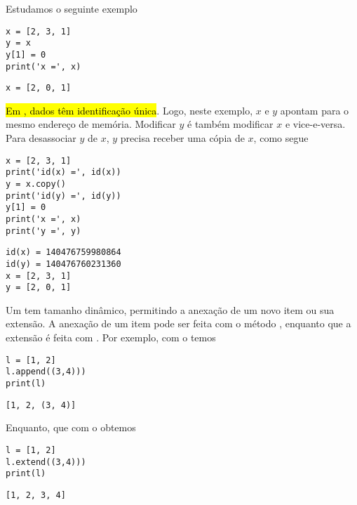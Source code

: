 \begin{obs}
  Estudamos o seguinte exemplo

\begin{lstlisting}
x = [2, 3, 1]
y = x
y[1] = 0
print('x =', x)
\end{lstlisting}

\begin{verbatim}
x = [2, 0, 1]
\end{verbatim}

\hl{Em {\python}, dados têm identificação única}. Logo, neste exemplo, $x$ e $y$ apontam para o mesmo endereço de memória. Modificar $y$ é também modificar $x$ e vice-e-versa. Para desassociar $y$ de $x$, $y$ precisa receber uma cópia de $x$, como segue

\begin{lstlisting}
x = [2, 3, 1]
print('id(x) =', id(x))
y = x.copy()
print('id(y) =', id(y))
y[1] = 0
print('x =', x)
print('y =', y)
\end{lstlisting}

\begin{verbatim}
id(x) = 140476759980864
id(y) = 140476760231360
x = [2, 3, 1]
y = [2, 0, 1]
\end{verbatim}

\end{obs}

\begin{obs}
  Um {\PYTHONlist} tem tamanho dinâmico, permitindo a anexação de um novo item ou sua extensão. A anexação de um item pode ser feita com o método {\PYTHONlistDOTappend}, enquanto que a extensão é feita com {\PYTHONlistDOTextend}. Por exemplo, com o {\PYTHONlistDOTappend} temos

\begin{lstlisting}
l = [1, 2]
l.append((3,4)))
print(l)
\end{lstlisting}

\begin{verbatim}
[1, 2, (3, 4)]
\end{verbatim}

Enquanto, que com o {\PYTHONlistDOTextend} obtemos

\begin{lstlisting}
l = [1, 2]
l.extend((3,4)))
print(l)
\end{lstlisting}
  
\begin{verbatim}
[1, 2, 3, 4]
\end{verbatim}
  
\end{obs}

